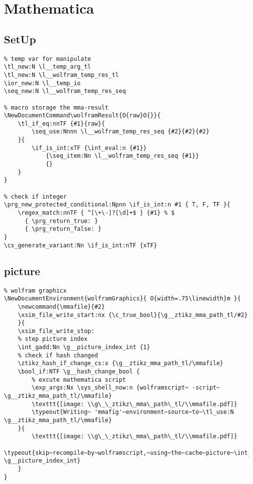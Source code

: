 \section{Mathematica}
\subsection{SetUp}
\begin{verbatim}
% temp var for manipulate
\tl_new:N \l__temp_arg_tl
\tl_new:N \l__wolfram_temp_res_tl
\ior_new:N \l__temp_io
\seq_new:N \l__wolfram_temp_res_seq

% macro storage the mma-result
\NewDocumentCommand\wolframResult{O{raw}O{}}{
    \tl_if_eq:nnTF {#1}{raw}{
        \seq_use:Nnnn \l__wolfram_temp_res_seq {#2}{#2}{#2}
    }{
        \if_is_int:xTF {\int_eval:n {#1}}
            {\seq_item:Nn \l__wolfram_temp_res_seq {#1}}
            {}
    }
}

% check if integer
\prg_new_protected_conditional:Npnn \if_is_int:n #1 { T, F, TF }{
    \regex_match:nnTF { ^[\+\-]?[\d]+$ } {#1} % $
      { \prg_return_true: }
      { \prg_return_false: }
}
\cs_generate_variant:Nn \if_is_int:nTF {xTF}
\end{verbatim}

\subsection{picture}
\begin{verbatim}
% wolfram graphicx
\NewDocumentEnvironment{wolframGraphics}{ O{width=.75\linewidth}m }{
    \newcommand{\mmafile}{#2}
    \xsim_file_write_start:nx {\c_true_bool}{\g__ztikz_mma_path_tl/#2}
    }{ 
    \xsim_file_write_stop:
    % step picture index
    \int_gadd:Nn \g__picture_index_int {1}   
    % check if hash changed
    \ztikz_hash_if_change_cs:x {\g__ztikz_mma_path_tl/\mmafile}   
    \bool_if:NTF \g__hash_change_bool {
        % excute mathematica script
        \exp_args:Nx \sys_shell_now:n {wolframscript~ -script~ \g__ztikz_mma_path_tl/\mmafile} 
        \texttt{[image: \\g\_\_ztikz\_mma\_path\_tl/\\mmafile.pdf]}
        \typeout{Writing~ 'mmafig'~environment~source~to~\tl_use:N \g__ztikz_mma_path_tl/\mmafile}
    }{
        \texttt{[image: \\g\_\_ztikz\_mma\_path\_tl/\\mmafile.pdf]}
        \typeout{skip~recompile~by~wolframscript,~using~the~cache~picture~\int_use:N \g__picture_index_int}
    }
}
\end{verbatim}


